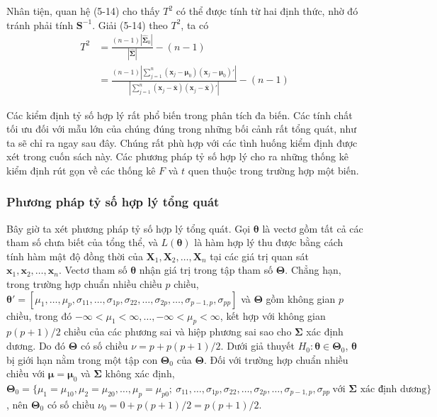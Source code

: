 Nhân tiện, quan hệ (5-14) cho thấy $T^2$ có thể được tính từ hai định thức, nhờ đó tránh phải tính $\mathbf{S}^{-1}$. Giải (5-14) theo $T^2$, ta có
\begin{equation}
\begin{aligned}
T^2 &= \frac{(n-1)|\hat{\boldsymbol{\Sigma}}_0|}{|\hat{\boldsymbol{\Sigma}}|} - (n-1) \\
&= \frac{(n-1)\left|\sum\limits_{j=1}^{n}(\mathbf{x}_j - \boldsymbol{\mu}_0)(\mathbf{x}_j - \boldsymbol{\mu}_0)'\right|}{\left|\sum\limits_{j=1}^{n}(\mathbf{x}_j - \bar{\mathbf{x}})(\mathbf{x}_j - \bar{\mathbf{x}})'\right|} - (n-1)
\end{aligned}
\tag{5-15}
\end{equation}

Các kiểm định tỷ số hợp lý rất phổ biến trong phân tích đa biến. Các tính chất tối ưu đối với mẫu lớn của chúng đúng trong những bối cảnh rất tổng quát, như ta sẽ chỉ ra ngay sau đây. Chúng rất phù hợp với các tình huống kiểm định được xét trong cuốn sách này. Các phương pháp tỷ số hợp lý cho ra những thống kê kiểm định rút gọn về các thống kê $F$ và $t$ quen thuộc trong trường hợp một biến.

\subsubsection*{Phương pháp tỷ số hợp lý tổng quát}

Bây giờ ta xét phương pháp tỷ số hợp lý tổng quát. Gọi $\boldsymbol{\theta}$ là vectơ gồm tất cả các tham số chưa biết của tổng thể, và $L(\boldsymbol{\theta})$ là hàm hợp lý thu được bằng cách tính hàm mật độ đồng thời của $\mathbf{X}_1,\mathbf{X}_2,\dots,\mathbf{X}_n$ tại các giá trị quan sát $\mathbf{x}_1,\mathbf{x}_2,\dots,\mathbf{x}_n$. Vectơ tham số $\boldsymbol{\theta}$ nhận giá trị trong tập tham số $\boldsymbol{\Theta}$. Chẳng hạn, trong trường hợp chuẩn nhiều chiều $p$ chiều, $\boldsymbol{\theta}'=[\mu_1,\dots,\mu_p,\sigma_{11},\dots,\sigma_{1p},\sigma_{22},\dots,\sigma_{2p},\dots,\sigma_{p-1,p},\sigma_{pp}]$ và $\boldsymbol{\Theta}$ gồm không gian $p$ chiều, trong đó $-\infty<\mu_1<\infty,\dots,-\infty<\mu_p<\infty$, kết hợp với không gian $p(p+1)/2$ chiều của các phương sai và hiệp phương sai sao cho $\boldsymbol{\Sigma}$ xác định dương. Do đó $\boldsymbol{\Theta}$ có số chiều $\nu = p + p(p+1)/2$. Dưới giả thuyết $H_0: \boldsymbol{\theta} \in \boldsymbol{\Theta}_0$, $\boldsymbol{\theta}$ bị giới hạn nằm trong một tập con $\boldsymbol{\Theta}_0$ của $\boldsymbol{\Theta}$. Đối với trường hợp chuẩn nhiều chiều với $\boldsymbol{\mu}=\boldsymbol{\mu}_0$ và $\boldsymbol{\Sigma}$ không xác định, $\boldsymbol{\Theta}_0=\{\mu_1=\mu_{10},\mu_2=\mu_{20},\dots,\mu_p=\mu_{p0};\ \sigma_{11},\dots,\sigma_{1p},\sigma_{22},\dots,\sigma_{2p},\dots,\sigma_{p-1,p},\sigma_{pp}\ \text{với } \boldsymbol{\Sigma} \text{ xác định dương}\}$, nên $\boldsymbol{\Theta}_0$ có số chiều $\nu_0 = 0 + p(p+1)/2 = p(p+1)/2$.


